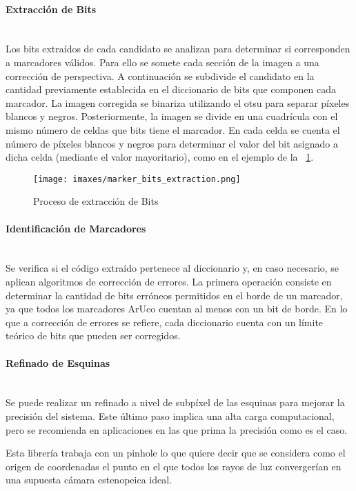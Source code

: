 \paragraph{Extracción de Bits}~\\
Los bits extraídos de cada candidato se analizan para determinar si corresponden a marcadores válidos.
Para ello se somete cada sección de la imagen a una corrección de perspectiva. A continuación se subdivide el candidato en la cantidad previamente establecida en el diccionario de bits que componen cada marcador. La imagen corregida se binariza utilizando el \gls{otsu} para separar píxeles blancos y negros. Posteriormente, la imagen se divide en una cuadrícula con el mismo número de celdas que bits tiene el marcador. En cada celda se cuenta el número de píxeles blancos y negros para determinar el valor del bit asignado a dicha celda (mediante el valor mayoritario), como en el ejemplo de la \figurename~\ref{fig:mbe}.

\begin{figure}
  \centering
  \texttt{[image: imaxes/marker\_bits\_extraction.png]}
  \caption{Proceso de extracción de Bits}\label{fig:mbe}
\end{figure}

\paragraph{Identificación de Marcadores}~\\
Se verifica si el código extraído pertenece al diccionario y, en caso necesario, se aplican algoritmos de corrección de errores.
La primera operación consiste en determinar la cantidad de bits erróneos permitidos en el borde de un marcador, ya que todos los marcadores ArUco cuentan al menos con un bit de borde. En lo que a corrección de errores se refiere, cada diccionario cuenta con un límite teórico de bits que pueden ser corregidos.

\paragraph{Refinado de Esquinas}~\\
Se puede realizar un refinado a nivel de subpíxel de las esquinas para mejorar la precisión del sistema. Este último paso implica una alta carga computacional, pero se recomienda en aplicaciones en las que prima la precisión como es el caso.

Esta librería trabaja con un \gls{pinhole} lo que quiere decir que se considera como el origen de coordenadas el punto en el que todos los rayos de luz convergerían en una supuesta cámara estenopeica ideal.

